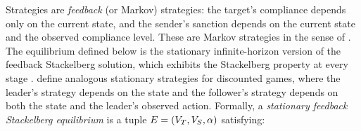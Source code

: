 Strategies are \emph{feedback} (or Markov) strategies: the target's compliance depends
only on the current state, and the sender's sanction depends on the current state and
the observed compliance level. These are Markov strategies in the sense of
\citet{MaskinTirole2001}. The equilibrium defined below is the stationary
infinite-horizon version of the feedback Stackelberg solution, which exhibits the
Stackelberg property at every stage \citep[Def.~3.29 and Sec.~7.3]{basar1999}.
\citet{BretonAljHaurie1988} define analogous stationary strategies for discounted
games, where the leader's strategy depends on the state and the follower's strategy
depends on both the state and the leader's observed action. Formally, a
\emph{stationary feedback Stackelberg equilibrium} is a tuple $E=(V_T,V_S,\alpha)$
satisfying:
